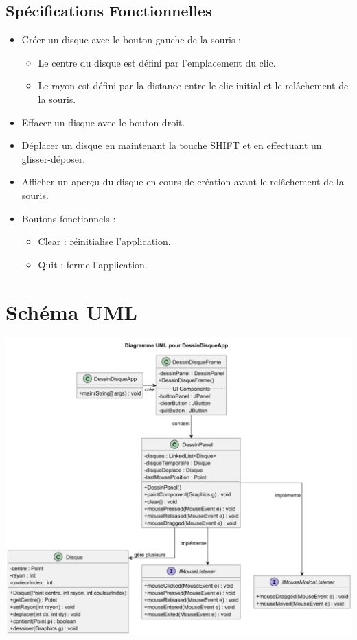 \documentclass[12pt]{report}
\begin{document}
    \subsection*{Spécifications Fonctionnelles}
    \begin{itemize}
        \item Créer un disque avec le bouton gauche de la souris :
        \begin{itemize}
            \item Le centre du disque est défini par l'emplacement du clic.
            \item Le rayon est défini par la distance entre le clic initial et le relâchement de la souris.
        \end{itemize}
        \item Effacer un disque avec le bouton droit.
        \item Déplacer un disque en maintenant la touche SHIFT et en effectuant un glisser-déposer.
        \item Afficher un aperçu du disque en cours de création avant le relâchement de la souris.
        \item Boutons fonctionnels :
        \begin{itemize}
            \item Clear : réinitialise l'application.
            \item Quit : ferme l'application.
        \end{itemize}
    \end{itemize}

    \section*{Schéma UML}
    \includegraphics[scale=0.5]{images/SchemaUML}
\end{document}
